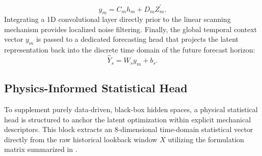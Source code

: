 \documentclass[cmes,article,submit,moreauthors,pdftex]{Definitions/tsp}
\begin{document}
\begin{equation}
y_{m} = C_{m} h_{m} + D_{m} Z_{m}^{\prime}.
\tag{9}
\end{equation}
Integrating a 1D convolutional layer directly prior to the linear scanning mechanism provides localized noise filtering. Finally, the global temporal context vector $y_{m}$ is passed to a dedicated forecasting head that projects the latent representation back into the discrete time domain of the future forecast horizon:
\begin{equation}
\widehat{Y}_{s} = W_{s} y_{m} + b_{s}.
\tag{10}
\end{equation}

\subsection{Physics-Informed Statistical Head} \label{sect:s3dot4}
To supplement purely data-driven, black-box hidden spaces, a physical statistical head is structured to anchor the latent optimization within explicit mechanical descriptors. This block extracts an 8-dimensional time-domain statistical vector directly from the raw historical lookback window $X$ utilizing the formulation matrix summarized in .
\end{document}
